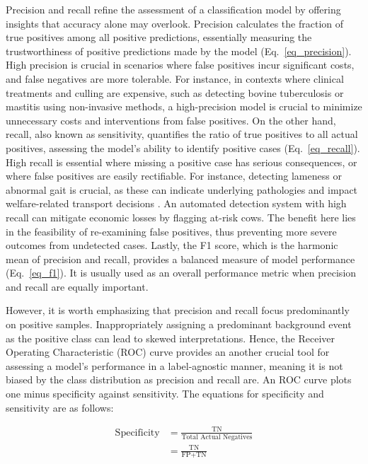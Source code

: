 Precision and recall refine the assessment of a classification model by offering insights that accuracy alone may overlook. Precision calculates the fraction of true positives among all positive predictions, essentially measuring the trustworthiness of positive predictions made by the model (Eq.~\ref{eq_precision}). High precision is crucial in scenarios where false positives incur significant costs, and false negatives are more tolerable. For instance, in contexts where clinical treatments and culling are expensive, such as detecting bovine tuberculosis \citep{denholm_predicting_2020} or mastitis \citep{kandeel_ability_2019} using non-invasive methods, a high-precision model is crucial to minimize unnecessary costs and interventions from false positives. On the other hand, recall, also known as sensitivity, quantifies the ratio of true positives to all actual positives, assessing the model's ability to identify positive cases (Eq.~\ref{eq_recall}). High recall is essential where missing a positive case has serious consequences, or where false positives are easily rectifiable. For instance, detecting lameness or abnormal gait is crucial, as these can indicate underlying pathologies \citep{oleary_invited_2020} and impact welfare-related transport decisions \citep{stojkov_hot_2018}. An automated detection system \citep{oleary_invited_2020, alsaaod_automatic_2019,kang_accurate_2020} with high recall can mitigate economic losses by flagging at-risk cows. The benefit here lies in the feasibility of re-examining false positives, thus preventing more severe outcomes from undetected cases. Lastly, the F1 score, which is the harmonic mean of precision and recall, provides a balanced measure of model performance (Eq.~\ref{eq_f1}). It is usually used as an overall performance metric when precision and recall are equally important.

However, it is worth emphasizing that precision and recall focus predominantly on positive samples. Inappropriately assigning a predominant background event as the positive class can lead to skewed interpretations. Hence, the Receiver Operating Characteristic (ROC) curve provides an another crucial tool for assessing a model's performance in a label-agnostic manner, meaning it is not biased by the class distribution as precision and recall are. An ROC curve plots one minus specificity against sensitivity. The equations for specificity and sensitivity are as follows:

\begin{equation} \label{eq_specificity}
    \begin{split}
    \text{Specificity} &= \frac{\text{TN}}{\text{Total Actual Negatives}} \\
                        &=\frac{\text{TN}}{\text{FP} + \text{TN}}
    \end{split}
\end{equation}

